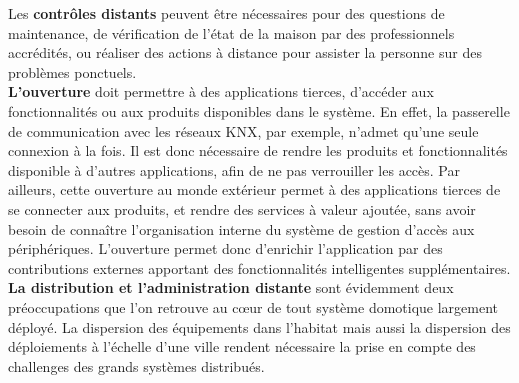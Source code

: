 Les {\bf contrôles distants} peuvent être nécessaires pour des questions de maintenance, de vérification de l'état de la maison par des professionnels accrédités, ou réaliser des actions à distance pour assister la personne sur des problèmes ponctuels.\\




{\bf L'ouverture} doit permettre à des applications tierces, d'accéder aux fonctionnalités ou aux produits disponibles dans le système. En effet, la passerelle de communication avec les réseaux KNX, par exemple, n'admet qu'une seule connexion à la fois. Il est donc nécessaire de rendre les produits et fonctionnalités disponible à d'autres applications, afin de ne pas verrouiller les accès. Par ailleurs, cette ouverture au monde extérieur permet à des applications tierces de se connecter aux produits, et rendre des services à valeur ajoutée, sans avoir besoin de connaître l'organisation interne du système de gestion d'accès aux périphériques. L'ouverture permet donc d'enrichir l'application par des contributions externes apportant des fonctionnalités intelligentes supplémentaires.\\

{\bf La distribution et l'administration distante} sont évidemment deux préoccupations que l'on retrouve au c\oe ur de tout système domotique largement déployé. La dispersion des équipements dans l'habitat mais aussi la dispersion des déploiements à l'échelle d'une ville rendent nécessaire la prise en compte des challenges des grands systèmes distribués.\\


